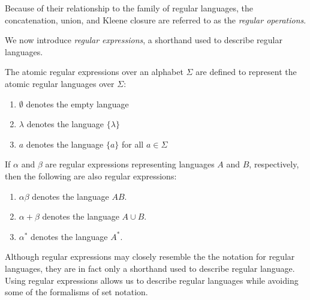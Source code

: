 \documentclass{bcthesis}
\renewcommand{\meo}[1]{}
\newcommand{\footcite}[2]{\footnote{\cite[pg.~{#2}]{#1}}}
\renewcommand{\footcite}[2]{\cite[pg.~{#2}]{#1}}
\begin{document}
	\begin{remark}
		Because of their relationship to the family of regular languages, the concatenation, union, and Kleene closure are referred to as the \textit{regular operations}.\footcite{salomaa}{26}
	\end{remark}

	We now introduce \textit{regular expressions}, a shorthand used to describe regular languages.

	\begin{definition}
		The atomic regular expressions over an alphabet $\Sigma$ are defined to represent the atomic regular languages over $\Sigma$:
		\begin{enumerate}[label=(\roman*), itemsep = -0.3 ex, nolistsep]
			\item $\emptyset$ denotes the empty language
			\item $\lambda$ denotes the language $\{ \lambda \}$
			\item $a$ denotes the language $\{ a \}$ for all $a \in \Sigma$
		\end{enumerate}
		\footcite{hopcroft}{28--29}

		If $\alpha$ and $\beta$ are regular expressions representing languages $A$ and $B$, respectively, then the following are also regular expressions:
		\begin{enumerate}[label=(\roman*), itemsep = -0.3 ex, nolistsep]
			\item $\alpha \beta$ denotes the language $AB$.
			\item $\alpha + \beta$ denotes the language $A \cup B$.
			\item $\alpha^*$ denotes the language $A^*$.
		\end{enumerate}
		\footcite{hopcroft}{28--29}
	\end{definition}

	\begin{remark}
		Although regular expressions may closely resemble the the notation for regular languages, they are in fact only a shorthand used to describe regular language. 
		Using regular expressions allows us to describe regular languages while avoiding some of the formalisms of set notation.
		\meo{
			Is this a convincing reason why this is a thing worth having?
			Maybe mention that a language is regular if and only if it can be described by a regular expression.
		}

	\end{remark}

	\meo{
		I could mention here that regular expressions are an example of a grammar, shockingly belonging to the class of regular grammars.
	}
\end{document}
